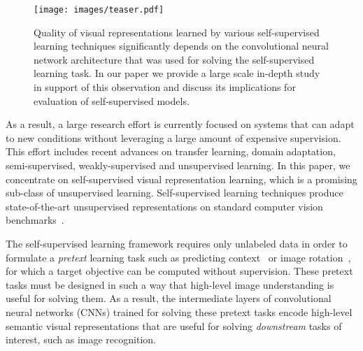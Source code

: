 \documentclass[10pt,twocolumn,letterpaper]{article}
\begin{document}
\begin{figure}[t]
  \begin{center}
    \texttt{[image: images/teaser.pdf]}
  \end{center}
  \caption{
     Quality of visual representations learned by various self-supervised learning techniques significantly depends on the convolutional neural network architecture that was used for solving the self-supervised learning task.
     In our paper we provide a large scale in-depth study in support of this observation and discuss its implications for evaluation of self-supervised models.
     }
     \label{fig:teaser}
\end{figure}


As a result, a large research effort is currently focused on systems that
can adapt to new conditions without leveraging a large amount of expensive
supervision.
This effort includes recent advances on transfer learning, domain adaptation,
semi-supervised, weakly-supervised and unsupervised learning.
In this paper, we concentrate on self-supervised visual representation learning, which is a promising sub-class of unsupervised learning.
Self-supervised learning techniques produce state-of-the-art unsupervised representations on standard computer vision benchmarks~\cite{gidaris2018unsupervised,oord2018representation,caron2018deep}.


The self-supervised learning framework requires only unlabeled data in order to formulate a \emph{pretext} learning task such as predicting context~\cite{doersch2015unsupervised} or image rotation~\cite{gidaris2018unsupervised}, for which a target objective can be computed without supervision.
These pretext tasks must be designed in such a way that high-level image understanding is useful for solving them.
As a result, the intermediate layers of convolutional neural networks (CNNs) trained for solving these pretext tasks encode high-level semantic visual representations that are useful for solving \emph{downstream} tasks of interest, such as image recognition.
\end{document}
